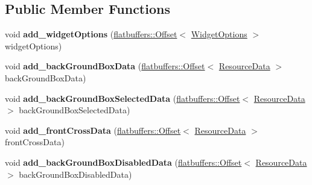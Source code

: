 \subsection*{Public Member Functions}
\begin{DoxyCompactItemize}
\item 
\mbox{\label{structflatbuffers_1_1CheckBoxOptionsBuilder_a0c78a11ee430ab944c86057dc253528a}} 
void {\bfseries add\+\_\+widget\+Options} (\hyperlink{structflatbuffers_1_1Offset}{flatbuffers\+::\+Offset}$<$ \hyperlink{structflatbuffers_1_1WidgetOptions}{Widget\+Options} $>$ widget\+Options)
\item 
\mbox{\label{structflatbuffers_1_1CheckBoxOptionsBuilder_ade8e6888ee271128712d259baf14e89f}} 
void {\bfseries add\+\_\+back\+Ground\+Box\+Data} (\hyperlink{structflatbuffers_1_1Offset}{flatbuffers\+::\+Offset}$<$ \hyperlink{structflatbuffers_1_1ResourceData}{Resource\+Data} $>$ back\+Ground\+Box\+Data)
\item 
\mbox{\label{structflatbuffers_1_1CheckBoxOptionsBuilder_abf7c7d581e8b48d48367ec676b6c5842}} 
void {\bfseries add\+\_\+back\+Ground\+Box\+Selected\+Data} (\hyperlink{structflatbuffers_1_1Offset}{flatbuffers\+::\+Offset}$<$ \hyperlink{structflatbuffers_1_1ResourceData}{Resource\+Data} $>$ back\+Ground\+Box\+Selected\+Data)
\item 
\mbox{\label{structflatbuffers_1_1CheckBoxOptionsBuilder_a7de8d21d784d59c3e895de37cbf99f81}} 
void {\bfseries add\+\_\+front\+Cross\+Data} (\hyperlink{structflatbuffers_1_1Offset}{flatbuffers\+::\+Offset}$<$ \hyperlink{structflatbuffers_1_1ResourceData}{Resource\+Data} $>$ front\+Cross\+Data)
\item 
\mbox{\label{structflatbuffers_1_1CheckBoxOptionsBuilder_a15f9739ccc95c69bc59b4e0f53239798}} 
void {\bfseries add\+\_\+back\+Ground\+Box\+Disabled\+Data} (\hyperlink{structflatbuffers_1_1Offset}{flatbuffers\+::\+Offset}$<$ \hyperlink{structflatbuffers_1_1ResourceData}{Resource\+Data} $>$ back\+Ground\+Box\+Disabled\+Data)
\item 
\mbox{\label{structflatbuffers_1_1CheckBoxOptionsBuilder_a3abfc58e3df24a2e8e5244c66531601f}} 

\end{DoxyCompactItemize}
